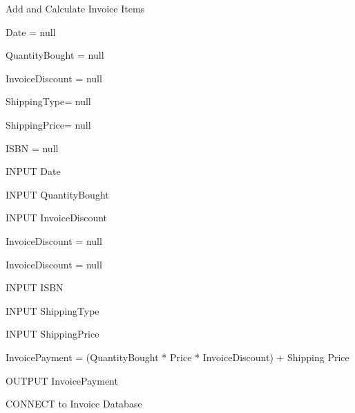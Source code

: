 \begin{algorithm}[H]
    \caption{Add and Calculate Invoice Items}
\begin{algorithmic}[1]



Date = null

QuantityBought = null

InvoiceDiscount = null

ShippingType= null

ShippingPrice= null

ISBN = null



    INPUT Date

\EndWhile


    INPUT QuantityBought

\EndWhile


    INPUT InvoiceDiscount


        InvoiceDiscount = null

    \EndIf


        InvoiceDiscount = null

    \EndIf

\EndWhile



    INPUT ISBN

\EndWhile


    INPUT ShippingType

\EndWhile


    INPUT ShippingPrice

\EndWhile


    InvoicePayment = (QuantityBought * Price * InvoiceDiscount) + Shipping Price

    OUTPUT InvoicePayment

\EndIf

    
    CONNECT to Invoice Database
    
\EndIf

\EndFunction
\end{algorithmic}
\end{algorithm}


